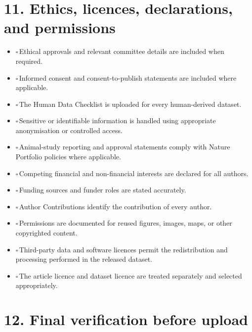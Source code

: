 \documentclass[11pt]{article}
\newcommand{\cbox}{$\square$\,}
\begin{document}
\section*{11. Ethics, licences, declarations, and permissions}

\begin{itemize}
    \item \cbox Ethical approvals and relevant committee details are included when required.
    \item \cbox Informed consent and consent-to-publish statements are included where applicable.
    \item \cbox The Human Data Checklist is uploaded for every human-derived dataset.
    \item \cbox Sensitive or identifiable information is handled using appropriate anonymisation or controlled access.
    \item \cbox Animal-study reporting and approval statements comply with Nature Portfolio policies where applicable.
    \item \cbox Competing financial and non-financial interests are declared for all authors.
    \item \cbox Funding sources and funder roles are stated accurately.
    \item \cbox Author Contributions identify the contribution of every author.
    \item \cbox Permissions are documented for reused figures, images, maps, or other copyrighted content.
    \item \cbox Third-party data and software licences permit the redistribution and processing performed in the released dataset.
    \item \cbox The article licence and dataset licence are treated separately and selected appropriately.
\end{itemize}

\section*{12. Final verification before upload}
\end{document}
